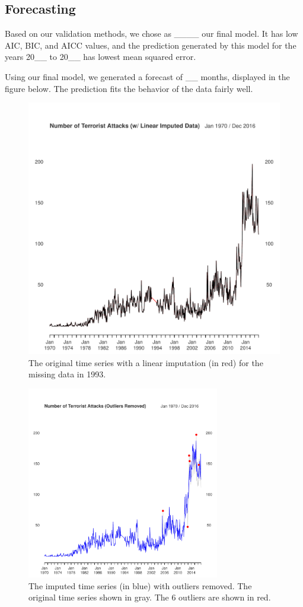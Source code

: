 \documentclass[font=12pt]{paper}
\begin{document}
\subsection{Forecasting}

Based on our validation methods, we chose as ____ our final model. It has low AIC, BIC, and AICC values, and the prediction generated by this model for the years 20__ to 20__ has lowest mean squared error.

Using our final model, we generated a forecast of __ months, displayed in the figure below. The prediction fits the behavior of the data fairly well.






\begin{figure}
\centering
\includegraphics[width=0.75\linewidth]{../image/og_ts.pdf}
\caption{The original time series with a linear imputation (in red) for the missing data in 1993.}
\label{og}
\end{figure}

\begin{figure}
\centering
    \includegraphics[width=0.75\textwidth]{../image/outlier_comparison.pdf}
\caption{The imputed time series (in blue) with outliers removed. The original time series shown in gray. The 6 outliers are shown in red. }
\label{outlier}
\end{figure}
\end{document}
